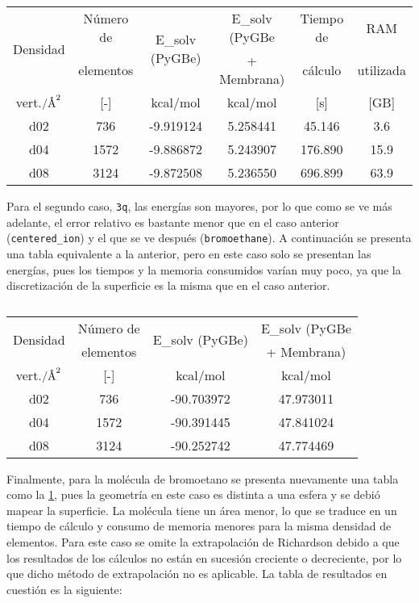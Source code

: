 \documentclass[12pt, oneside, numbers, spanish]{ezthesis}
\numberwithin{equation}{section}
\newcommand{\angstrom}{\text{\normalfont\AA}}
\begin{document}
\begin{table}[H]
	\centering
	\caption{}
	\def\arraystretch{0.8}
	\begin{tabular}{|cccccc}\hline
		\multirow{2}{*}{Densidad} & Número de & \multirow{2}{*}{E\_solv (PyGBe)} & E\_solv (PyGBe & Tiempo de & RAM\\
		 & elementos &  & + Membrana) & cálculo & utilizada\\\hline
		vert.$/\angstrom^2$ & \rule{0pt}{15pt}[-] & kcal/mol & kcal/mol & [s] & [GB] \\\hline
		d02 & 736 & -9.919124 & 5.258441 & 45.146 & 3.6\\
		d04 & 1572 & -9.886872 & 5.243907 & 176.890 & 15.9\\
		d08 & 3124 & -9.872508 & 5.236550 & 696.899 & 63.9 \\ \hline
	\end{tabular}\label{table:pygbe_centered_ion}
\end{table}
\noindent
Para el segundo caso, \texttt{3q}, las energías son mayores, por lo que como se ve más adelante, el error relativo es bastante menor que en el caso anterior (\texttt{centered\_ion}) y el que se ve después (\texttt{bromoethane}). A continuación se presenta una tabla equivalente a la anterior, pero en este caso solo se presentan las energías, pues los tiempos y la memoria consumidos varían muy poco, ya que la discretización de la superficie es la misma que en el caso anterior.

\begin{table}[H]
	\centering
	\caption{}
	\def\arraystretch{0.8}
	\begin{tabular}{|cccc|}\hline
		\multirow{2}{*}{Densidad} & Número de & \multirow{2}{*}{E\_solv (PyGBe)} & E\_solv (PyGBe \\
		& elementos &  & + Membrana) \\\hline
		\rule{0pt}{15pt} vert.$/\angstrom^2$ & [-] & kcal/mol & kcal/mol \\\hline
		d02 & 736 & -90.703972 & 47.973011 \\
		d04 & 1572 & -90.391445 & 47.841024 \\
		d08 & 3124 & -90.252742 & 47.774469 \\ \hline
	\end{tabular}\label{table:pygbe_3q}
\end{table}
\noindent
Finalmente, para la molécula de bromoetano se presenta nuevamente una tabla como la \ref{table:pygbe_centered_ion}, pues la geometría en este caso es distinta a una esfera y se debió mapear la superficie. La molécula tiene un área menor, lo que se traduce en un tiempo de cálculo y consumo de memoria menores para la misma densidad de elementos. Para este caso se omite la extrapolación de Richardson debido a que los resultados de los cálculos no están en sucesión creciente o decreciente, por lo que dicho método de extrapolación no es aplicable. La tabla de resultados en cuestión es la siguiente:
\end{document}
